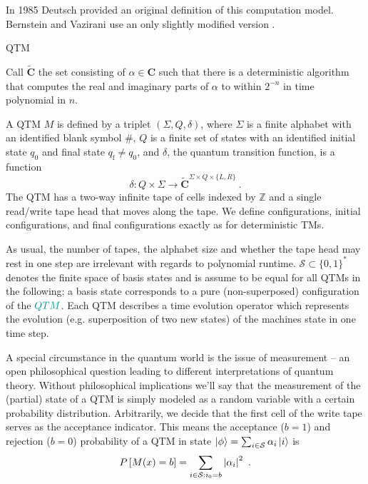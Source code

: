 In 1985 Deutsch \cite{deutsch_1985} provided an original definition of this computation model.
Bernstein and Vazirani use an only slightly modified version \cite{bernstein_vazirani_1997}.

\begin{definition}
\label{def:QTM}
\acl{QTM} \cite{bernstein_vazirani_1997}

Call $\mathbf{\tilde{C}}$ the set consisting of $\alpha\in\mathbf{C}$ such that there is a deterministic algorithm that computes the real and imaginary parts of $\alpha$ to within $2^{-n}$ in time polynomial in $n$.

A \ac{QTM} $M$ is defined by a triplet $(\Sigma, Q, \delta)$, where $\Sigma$ is a finite alphabet with an identified blank symbol $\#$, $Q$ is a finite set of states with an identified initial state $q_0$ and final state $q_\mathrm{f}\neq q_0$, and $\delta$, the quantum transition function, is a function
\begin{equation*}
    \delta
    :Q\times\Sigma
    \rightarrow
    \mathbf{\tilde{C}}^{\Sigma\times Q\times\{L,R\}}
    \ .
\end{equation*}
The \ac{QTM} has a two-way infinite tape of cells indexed by $\mathbb{Z}$ and a single read/write tape head that moves along the tape.
We define configurations, initial configurations, and final configurations exactly as for deterministic \acp{TM}.
\end{definition}

As usual, the number of tapes, the alphabet size and whether the tape head may rest in one step are irrelevant with regards to polynomial runtime.
$\mathcal{S}\subset\{0,1\}^*$ denotes the finite space of basis states and is assume to be equal for all \acp{QTM} in the following; a basis state corresponds to a pure (non-superposed) configuration of the $\QTM$.
Each \ac{QTM} describes a time evolution operator which represents the evolution (e.g. superposition of two new states) of the machines state in one time step.

A special circumstance in the quantum world is the issue of measurement -- an open philosophical question leading to different interpretations of quantum theory.
Without philosophical implications we'll say that the measurement of the (partial) state of a \ac{QTM} is simply modeled as a random variable with a certain probability distribution.
Arbitrarily, we decide that the first cell of the write tape serves as the acceptance indicator.
This means the acceptance ($b=1$) and rejection ($b=0$) probability of a \ac{QTM} in state $\ket{\phi}=\sum_{i\in\mathcal{S}}\alpha_i\ket{i}$ is
\begin{equation}
    P\left[M(x)=b\right]
    =\sum_{i\in\mathcal{S}:i_0=b}\left\vert\alpha_i\right\vert^2
    \ .
\end{equation}


